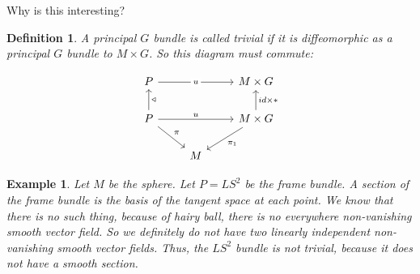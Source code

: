 \documentclass[11pt]{book}
\newtheorem{definition}[theorem]{Definition}
\newtheorem{example}[theorem]{Example}
\begin{document}
Why is this interesting?
\begin{definition}
A principal $G$ bundle is called trivial if it is diffeomorphic as a principal $G$
bundle to $M \times G$. So this diagram must commute:

\[\begin{tikzcd}
	P & {} & {M \times G} \\
	P & {} & {M\times G} \\
	& M
	\arrow["u", from=2-1, to=2-3]
	\arrow["\triangleleft"', from=2-1, to=1-1]
	\arrow["{id \times *}"', from=2-3, to=1-3]
	\arrow["u"{description}, from=1-1, to=1-3]
	\arrow["{\pi_1}", from=2-3, to=3-2]
	\arrow["\pi", from=2-1, to=3-2]
\end{tikzcd}\]
\end{definition}

\begin{example}
Let $M$ be the sphere. Let $P = LS^2$ be the frame bundle. A section of the frame bundle is the
basis of the tangent space at each point. We know that there is no such thing, because of hairy
ball, there is no everywhere non-vanishing smooth vector field. So we definitely do not have
two linearly independent non-vanishing smooth vector fields. Thus, the $LS^2$ bundle is not
trivial, because it does not have a smooth section.
\end{example}
\end{document}
